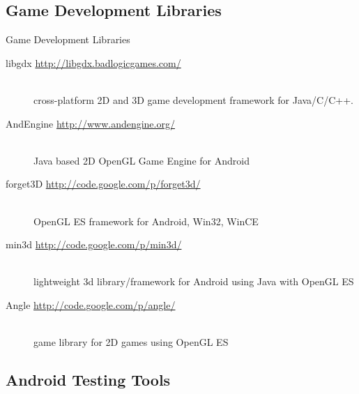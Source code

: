 \documentclass[aspectratio=169]{beamer}
\newcommand{\surl}[1] {{\tiny \url{#1}}}
\begin{document}

\subsection{Game Development Libraries}

    \begin{frame}{Game Development Libraries}
      \begin{description}
        \item[libgdx \surl{http://libgdx.badlogicgames.com/}] \hfill \\ cross-platform 2D and 3D game development framework for Java/C/C++. 
        \item[AndEngine \surl{http://www.andengine.org/}] \hfill \\ Java based 2D OpenGL Game Engine for Android
        \item[forget3D \surl{http://code.google.com/p/forget3d/}] \hfill \\ OpenGL ES framework for Android, Win32, WinCE
        \item[min3d \surl{http://code.google.com/p/min3d/}] \hfill \\ lightweight 3d library/framework for Android using Java with OpenGL ES 
        \item[Angle  \surl{http://code.google.com/p/angle/}] \hfill \\ game library for 2D games using OpenGL ES
      \end{description}
    \end{frame}

  \subsection{Android Testing Tools}
\end{document}
